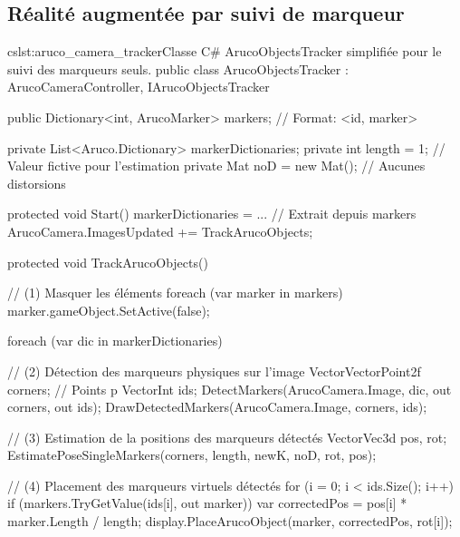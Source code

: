 \subsection{Réalité augmentée par suivi de marqueur}
\label{subsec:pinhole_camera_tracker}




\begin{listingETS}{cs}{lst:aruco_camera_tracker}{Classe C\# ArucoObjectsTracker simplifiée pour le suivi des marqueurs seuls.}
  public class ArucoObjectsTracker : ArucoCameraController, IArucoObjectsTracker
  {
    public Dictionary<int, ArucoMarker> markers; // Format: <id, marker>

    private List<Aruco.Dictionary> markerDictionaries;
    private int length = 1; // Valeur fictive pour l'estimation
    private Mat noD = new Mat(); // Aucunes distorsions

    protected void Start()
    {
      markerDictionaries = ... // Extrait depuis markers
      ArucoCamera.ImagesUpdated += TrackArucoObjects;
    }

    protected void TrackArucoObjects()
    {
      // (1) Masquer les éléments
      foreach (var marker in markers)
      {
        marker.gameObject.SetActive(false);
      }

      foreach (var dic in markerDictionaries)
      {
        // (2) Détection des marqueurs physiques sur l'image
        VectorVectorPoint2f corners; // Points p
        VectorInt ids;
        DetectMarkers(ArucoCamera.Image, dic, out corners, out ids);
        DrawDetectedMarkers(ArucoCamera.Image, corners, ids);
        
        // (3) Estimation de la positions des marqueurs détectés
        VectorVec3d pos, rot;
        EstimatePoseSingleMarkers(corners, length, newK, noD, rot, pos);

        // (4) Placement des marqueurs virtuels détectés
        for (i = 0; i < ids.Size(); i++)
        {
          if (markers.TryGetValue(ids[i], out marker))
          {
            var correctedPos = pos[i] * marker.Length / length;
            display.PlaceArucoObject(marker, correctedPos, rot[i]);
          }
        }
      }
    }
  }
\end{listingETS}

